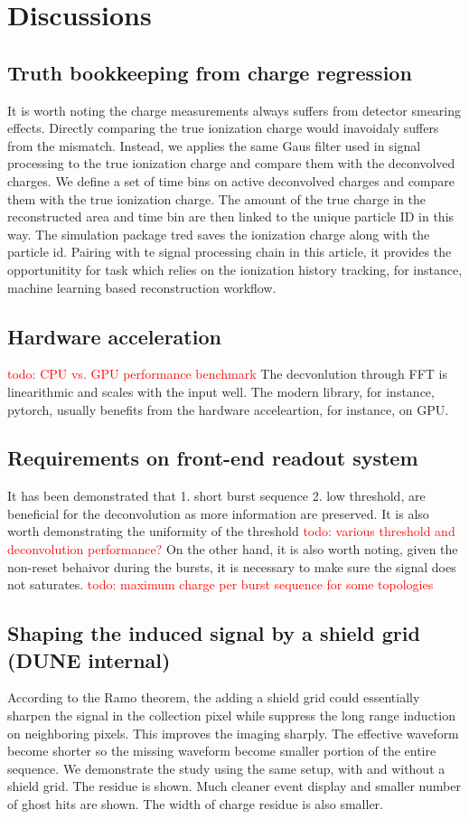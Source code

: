 \documentclass[a4paper,11pt]{article}
\begin{document}
\section{Discussions}
\subsection{Truth bookkeeping from charge regression}
It is worth noting the charge measurements always suffers from detector smearing effects. Directly comparing the true ionization charge would inavoidaly suffers from the mismatch. Instead, we applies the same Gaus filter used in signal processing to the true ionization charge and compare them with the deconvolved charges. We define a set of time bins on active deconvolved charges and compare them with the true ionization charge. The amount of the true charge in the reconstructed area and time bin are then linked to the unique particle ID in this way. The simulation package tred saves the ionization charge along with the particle id. Pairing with te signal processing chain in this article, it provides the opportunitity for task which relies on the ionization history tracking, for instance, machine learning based reconstruction workflow.
\subsection{Hardware acceleration}
\textcolor{red}{todo: CPU vs. GPU performance benchmark}
The decvonlution through FFT is linearithmic and scales with the input well. The modern library, for instance, pytorch, usually benefits from the hardware acceleartion, for instance, on GPU.
\subsection{Requirements on front-end readout system}
It has been demonstrated that 1. short burst sequence 2. low threshold, are beneficial for the deconvolution as more information are preserved.
It is also worth demonstrating the uniformity of the threshold
\textcolor{red}{todo: various threshold and deconvolution performance?}
On the other hand, it is also worth noting, given the non-reset behaivor during the bursts, it is necessary to make sure the signal does not saturates.
\textcolor{red}{todo: maximum charge per burst sequence for some topologies}
\subsection{Shaping the induced signal by a shield grid (DUNE internal)}
According to the Ramo theorem, the adding a shield grid could essentially sharpen the signal in the collection pixel while suppress the long range induction on neighboring pixels. This improves the imaging sharply. The effective waveform become shorter so the missing waveform become smaller portion of the entire sequence. We demonstrate the study using the same setup, with and without a shield grid. The residue is shown. Much cleaner event display and smaller number of ghost hits are shown. The width of charge residue is also smaller.
\end{document}

